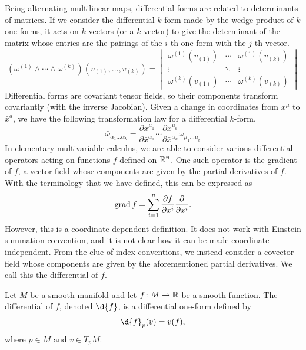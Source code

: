 \documentclass[a4paper,12pt]{article}
\begin{document}
Being alternating multilinear maps, differential forms are related to determinants of matrices.
If we consider the differential $k$-form made by the wedge product of $k$ one-forms, it acts on $k$ vectors (or a $k$-vector) to give the determinant of the matrix whose entries are the pairings of the $i$-th one-form with the $j$-th vector.
\begin{equation}
    (\omega^{(1)} \wedge \cdots \wedge \omega^{(k)})(v_{(1)}, \ldots, v_{(k)}) = \begin{vmatrix}
        \omega^{(1)}(v_{(1)}) & \cdots & \omega^{(1)}(v_{(k)}) \\
        \vdots & \ddots & \vdots \\
        \omega^{(k)}(v_{(1)}) & \cdots & \omega^{(k)}(v_{(k)})
    \end{vmatrix}
\end{equation}
Differential forms are covariant tensor fields, so their components transform covariantly (with the inverse Jacobian).
Given a change in coordinates from $x^\mu$ to $\bar{x}^a$, we have the following transformation law for a differential $k$-form.
\begin{equation}
    \bar{\omega}_{\alpha_1 \ldots \alpha_k} = \frac{\partial x^{\mu_1}}{\partial \bar{x}^{\alpha_1}} \cdots \frac{\partial x^{\mu_k}}{\partial \bar{x}^{\alpha_k}} \omega_{\mu_1 \ldots \mu_k}
\end{equation}
In elementary multivariable calculus, we are able to consider various differential operators acting on functions $f$ defined on $\mathbb{R}^n$.
One such operator is the gradient of $f$, a vector field whose components are given by the partial derivatives of $f$.
With the terminology that we have defined, this can be expressed as
\begin{equation}
    \operatorname{grad} f = \sum_{i=1}^n \frac{\partial f}{\partial x^i} \frac{\partial}{\partial x^i}.
\end{equation}
However, this is a coordinate-dependent definition.
It does not work with Einstein summation convention, and it is not clear how it can be made coordinate independent.
From the clue of index conventions, we instead consider a covector field whose components are given by the aforementioned partial derivatives.
We call this the differential of $f$.
\begin{definition}\label{def:differential_of_function}
    Let $M$ be a smooth manifold and let $f \colon M \to \mathbb{R}$ be a smooth function.
    The differential of $f$, denoted $\d{f}$, is a differential one-form defined by
    \begin{equation}
        \d{f}_p(v) = v(f),
    \end{equation}
    where $p \in M$ and $v \in T_p M$.
\end{definition}
\end{document}
